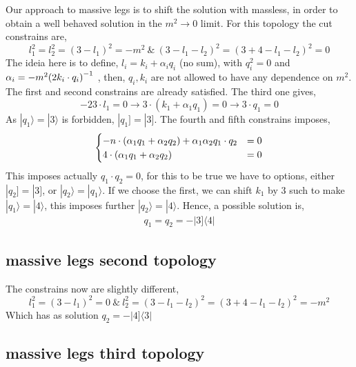 Our approach to massive legs is to shift the solution with massless, in order to obtain a well behaved solution in the 
$m^2\rightarrow0$ limit. For this topology the cut constrains are,
\[l_1^2=l_2^2=(3-l_1)^2=-m^2\ \&\ (3-l_1-l_2)^2=(3+4-l_1-l_2)^2=0\]
The ideia here is to define, $l_i=k_i+\alpha_i q_i$ (no sum), with $q_i^2=0$ and $\alpha_i=-m^2\qty(2k_i\cdot q_i)^{-1}$ , 
then, $q_i,k_i$ are not allowed to have any dependence on $m^2$. The first and second constrains are already satisfied. The third one gives,
\[-23\cdot l_1=0\rightarrow 3\cdot(k_1+\alpha_1 q_1)=0\rightarrow 3\cdot q_1=0\]
As $|q_1\rangle = |3\rangle$ is forbidden, $|q_1]=|3]$. The fourth and fifth constrains imposes,
\begin{align*}
    \begin{cases}
        -n\cdot\qty(\alpha_1 q_1+\alpha_2 q_2)+\alpha_1\alpha_2 q_1\cdot q_2&=0\\
        4\cdot \qty(\alpha_1 q_1+\alpha_2 q_2)&=0
    \end{cases}
\end{align*}
This imposes actually $q_1\cdot q_2=0$, for this to be true we have to options, either $|q_2]=|3]$, or $|q_2\rangle=|q_1\rangle$. If we choose the first, we can shift $k_1$ by $3$ such to 
make $|q_1\rangle=|4\rangle$, this imposes further $|q_2\rangle=|4\rangle$. Hence, a possible solution is,
\begin{align*}
    q_1=q_2=-|3]\langle 4|
\end{align*}

\subsection{massive legs second topology}

The constrains now are slightly different,
\[l_1^2=(3-l_1)^2=0\ \&\ l^2_2=(3-l_1-l_2)^2=(3+4-l_1-l_2)^2=-m^2\]
Which has as solution $q_2=-|4]\langle3|$

\subsection{massive legs third topology}

